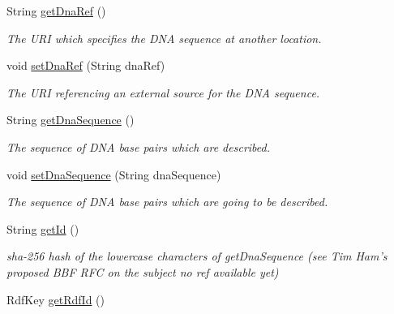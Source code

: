 \begin{DoxyCompactItemize}
\item 
String \hyperlink{classorg_1_1sbolstandard_1_1lib_s_b_o_lj_1_1_dna_sequence_aa65410fe45bf6277117ef6a880e6ddce}{getDnaRef} ()
\begin{DoxyCompactList}\small\item\em The URI which specifies the DNA sequence at another location. \item\end{DoxyCompactList}\item 
void \hyperlink{classorg_1_1sbolstandard_1_1lib_s_b_o_lj_1_1_dna_sequence_aa0c3edfacae2b9c35910b6b093ed83c6}{setDnaRef} (String dnaRef)
\begin{DoxyCompactList}\small\item\em The URI referencing an external source for the DNA sequence. \item\end{DoxyCompactList}\item 
String \hyperlink{classorg_1_1sbolstandard_1_1lib_s_b_o_lj_1_1_dna_sequence_afdb0bfaca178d65525b9c94a48eba865}{getDnaSequence} ()
\begin{DoxyCompactList}\small\item\em The sequence of DNA base pairs which are described. \item\end{DoxyCompactList}\item 
void \hyperlink{classorg_1_1sbolstandard_1_1lib_s_b_o_lj_1_1_dna_sequence_ae208d59837576eacf5feca6fbb552316}{setDnaSequence} (String dnaSequence)
\begin{DoxyCompactList}\small\item\em The sequence of DNA base pairs which are going to be described. \item\end{DoxyCompactList}\item 
String \hyperlink{classorg_1_1sbolstandard_1_1lib_s_b_o_lj_1_1_dna_sequence_aab219518f0eaf3db55b6a62ad6b49407}{getId} ()
\begin{DoxyCompactList}\small\item\em sha-\/256 hash of the lowercase characters of getDnaSequence (see Tim Ham's proposed BBF RFC on the subject no ref available yet) \item\end{DoxyCompactList}\item 
RdfKey \hyperlink{classorg_1_1sbolstandard_1_1lib_s_b_o_lj_1_1_dna_sequence_a98d34c30847c78a8922be878a2fa4d49}{getRdfId} ()

\end{DoxyCompactItemize}
